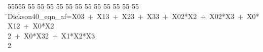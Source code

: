%
%
\begin{tabbing}
55555 \= 55 \= 55 \= 55 \= 55 \= 55 \= 55 \= 55 \= 55 \= 55 \= 55 \= 55 \= 55 \= \>Dickson40\_eqn\_af=X03\ +\ X13\ +\ X23\ +\ X33\ +\ X02*X2\ +\ X02*X3\ +\ X0*X12\ +\ X0*X2\\[0pt]
\>2\ +\ X0*X32\ +\ X1*X2*X3\\[0pt]
2\>\end{tabbing}
